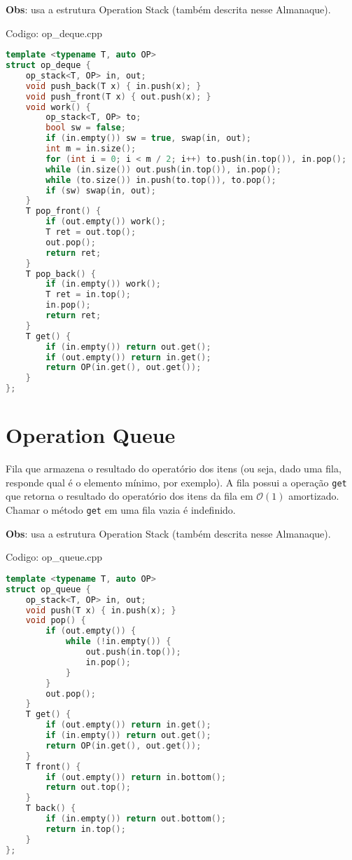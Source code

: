 \documentclass[10pt, a4paper, oneside]{book}
\begin{document}
\textbf{Obs}: usa a estrutura Operation Stack (também descrita nesse Almanaque).

\hfill

Codigo: op\_deque.cpp

\begin{lstlisting}[language=C++]
template <typename T, auto OP>
struct op_deque {
    op_stack<T, OP> in, out;
    void push_back(T x) { in.push(x); }
    void push_front(T x) { out.push(x); }
    void work() {
        op_stack<T, OP> to;
        bool sw = false;
        if (in.empty()) sw = true, swap(in, out);
        int m = in.size();
        for (int i = 0; i < m / 2; i++) to.push(in.top()), in.pop();
        while (in.size()) out.push(in.top()), in.pop();
        while (to.size()) in.push(to.top()), to.pop();
        if (sw) swap(in, out);
    }
    T pop_front() {
        if (out.empty()) work();
        T ret = out.top();
        out.pop();
        return ret;
    }
    T pop_back() {
        if (in.empty()) work();
        T ret = in.top();
        in.pop();
        return ret;
    }
    T get() {
        if (in.empty()) return out.get();
        if (out.empty()) return in.get();
        return OP(in.get(), out.get());
    }
};
\end{lstlisting}
\hfill

\section{Operation Queue}


Fila que armazena o resultado do operatório dos itens (ou seja, dado uma fila, responde qual é o elemento mínimo, por exemplo). A fila possui a operação \texttt{get} que retorna o resultado do operatório dos itens da fila em $\mathcal{O}(1)$ amortizado. Chamar o método \texttt{get} em uma fila vazia é indefinido.



\textbf{Obs}: usa a estrutura Operation Stack (também descrita nesse Almanaque).

\hfill

Codigo: op\_queue.cpp

\begin{lstlisting}[language=C++]
template <typename T, auto OP>
struct op_queue {
    op_stack<T, OP> in, out;
    void push(T x) { in.push(x); }
    void pop() {
        if (out.empty()) {
            while (!in.empty()) {
                out.push(in.top());
                in.pop();
            }
        }
        out.pop();
    }
    T get() {
        if (out.empty()) return in.get();
        if (in.empty()) return out.get();
        return OP(in.get(), out.get());
    }
    T front() {
        if (out.empty()) return in.bottom();
        return out.top();
    }
    T back() {
        if (in.empty()) return out.bottom();
        return in.top();
    }
};
\end{lstlisting}
\hfill
\end{document}
